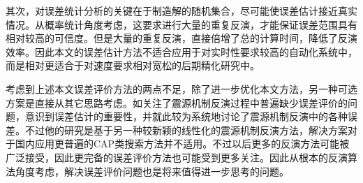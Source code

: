 其次，对误差统计分析的关键在于制造解的随机集合，尽可能使误差估计接近真实情况。从概率统计角度考虑，这要求进行大量的重复反演，才能保证误差范围具有相对较高的可信度。但是大量的重复反演，直接倍增了总的计算时间，降低了反演效率。因此本文的误差估计方法不适合应用于对实时性要求较高的自动化系统中，而是相对更适合于对速度要求相对宽松的后期精化研究中。

考虑到上述本文误差评价方法的两点不足，除了进一步优化本文方法，另一种可选方案是直接从其它思路考虑。如\citet{Duputel2012}关注了震源机制反演过程中普遍缺少误差评价的问题，意识到误差估计的重要性，并就此较为系统地讨论了震源机制反演中的各种误差。不过他的研究是基于另一种较新颖的线性化的震源机制反演方法，解决方案对于国内应用更普遍的CAP类搜索方法并不适用。不过以后更多的反演方法可能被广泛接受，因此更完备的误差评价方法也可能受到更多关注。因此从根本的反演算法角度考虑，解决误差评价问题也是将来值得进一步思考的问题。
